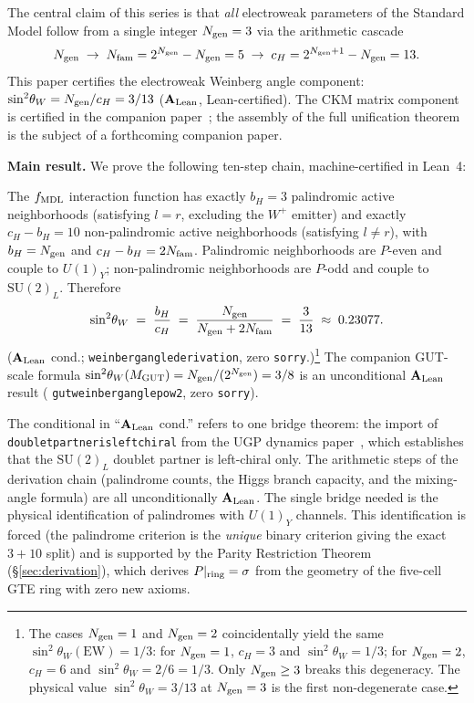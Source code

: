 \documentclass[11pt]{article}
\theoremstyle{remark}
\newcommand{\Ngen}{N_{\rm gen}}
\newcommand{\Nfam}{N_{\rm fam}}
\newcommand{\bH}{b_H}
\newcommand{\cH}{c_H}
\newcommand{\lean}[1]{%
  \penalty-100
  \begingroup\def\_{\textunderscore\allowbreak}\texttt{#1}\endgroup}
\newcommand{\sinwsq}{\sin^2\!\theta_W}
\newcommand{\CatAL}{\ensuremath{\textbf{A}_{\rm Lean}}}
\begin{document}
\medskip

The central claim of this series is that \emph{all} electroweak parameters of the
Standard Model follow from a single integer $\Ngen = 3$ via the arithmetic cascade
\[
  \Ngen \;\to\; \Nfam = 2^{\Ngen} - \Ngen = 5 \;\to\; \cH = 2^{\Ngen+1} - \Ngen = 13.
\]
This paper certifies the electroweak Weinberg angle component:
$\sinwsq = \Ngen/\cH = 3/13$ ($\CatAL$, Lean-certified).
The CKM matrix component is certified in the companion paper~\cite{SpivackCKM};
the assembly of the full unification theorem is the subject of a forthcoming companion
paper.

\medskip

\textbf{Main result.}
We prove the following ten-step chain, machine-certified in Lean~4:

\begin{tcolorbox}[colback=green!4,colframe=green!45!black,
  title={\textbf{Main result (WA-1)}},
  fonttitle=\bfseries,left=6pt,right=6pt,top=4pt,bottom=4pt]
\small
The $f_{\rm MDL}$ interaction function has exactly $\bH = 3$ palindromic active
neighborhoods (satisfying $l = r$, excluding the $W^+$ emitter) and exactly
$\cH - \bH = 10$ non-palindromic active neighborhoods (satisfying $l \neq r$),
with $\bH = \Ngen$ and $\cH - \bH = 2\Nfam$.
Palindromic neighborhoods are $P$-even and couple to $U(1)_Y$;
non-palindromic neighborhoods are $P$-odd and couple to $\mathrm{SU}(2)_L$.
Therefore
\[
  \sinwsq \;=\; \frac{\bH}{\cH} \;=\; \frac{\Ngen}{\Ngen + 2\Nfam} \;=\; \frac{3}{13}
  \;\approx\; 0.23077.
\]
($\CatAL$ cond.; \lean{weinberg\_angle\_derivation}, zero \texttt{sorry}.)\footnote{%
The cases $\Ngen = 1$ and $\Ngen = 2$ coincidentally yield the same
$\sinwsq(\mathrm{EW}) = 1/3$: for $\Ngen = 1$, $\cH = 3$ and $\sinwsq = 1/3$;
for $\Ngen = 2$, $\cH = 6$ and $\sinwsq = 2/6 = 1/3$.
Only $\Ngen \ge 3$ breaks this degeneracy.
The physical value $\sinwsq = 3/13$ at $\Ngen = 3$ is the first non-degenerate case.}
The companion GUT-scale formula $\sinwsq(M_{\rm GUT}) = \Ngen/(2^{\Ngen}) = 3/8$ is an
unconditional $\CatAL$ result (\lean{gut\_weinberg\_angle\_pow2}, zero \texttt{sorry}).
\end{tcolorbox}

\medskip

The conditional in ``$\CatAL$ cond.'' refers to one bridge theorem: the import of
\lean{doublet\_partner\_is\_left\_chiral} from the UGP dynamics
paper~\cite{Spivack2026_UGPDynamics}, which establishes that the $\mathrm{SU}(2)_L$
doublet partner is left-chiral only.  The arithmetic steps of the derivation chain
(palindrome counts, the Higgs branch capacity, and the mixing-angle formula) are
all unconditionally $\CatAL$.  The single bridge needed is the physical identification
of palindromes with $U(1)_Y$ channels.  This identification is forced (the palindrome
criterion is the \emph{unique} binary criterion giving the exact $3 + 10$ split) and
is supported by the Parity Restriction Theorem (\S\ref{sec:derivation}), which derives
$P|_{\rm ring} = \sigma$ from the geometry of the five-cell GTE ring with zero new
axioms.
\end{document}
